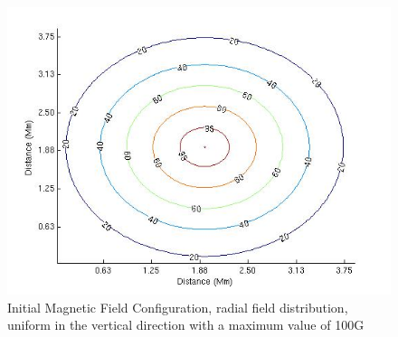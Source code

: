 \documentclass{aastex62}
\begin{document}
\begin{figure}[h]\label{inimagfieldplot}
\includegraphics[scale=0.7]{imrescale/bfield100G.jpg}
\caption{Initial Magnetic Field Configuration, radial field distribution, uniform in the vertical direction with a maximum value of 100G }
\end{figure}
\end{document}
